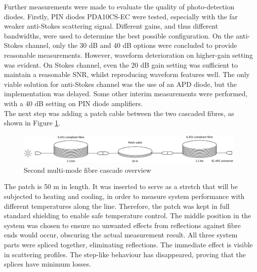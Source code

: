 \documentclass{standalone}
\begin{document}
Further measurements were made to evaluate the quality of photo-detection diodes. Firstly, PIN diodes PDA10CS-EC were tested, especially with the far weaker anti-Stokes scattering signal. Different gains, and thus different bandwidths, were used to determine the best possible configuration. On the anti-Stokes channel, only the 30 dB and 40 dB options were concluded to provide reasonable measurements. However, waveform deterioration on higher-gain setting was evident. On Stokes channel, even the 20 dB gain setting was sufficient to maintain a reasonable SNR, whilst reproducing waveform features well. The only viable solution for anti-Stokes channel was the use of an APD diode, but the implementation was delayed. Some other interim measurements were performed, with a 40 dB setting on PIN diode amplifiers. \\

The next step was adding a patch cable between the two cascaded fibres, as shown in Figure \ref{fig:mmf_second_cascade}.
\begin{figure}[h]
	\centering
	\includegraphics[width=1\textwidth]{mmf_second_cascade.png}
	\caption{Second multi-mode fibre cascade overview}
	\label{fig:mmf_second_cascade}
\end{figure}
The patch is 50 m in length. It was inserted to serve as a stretch that will be subjected to heating and cooling, in order to measure system performance with different temperatures along the line. Therefore, the patch was kept in full standard shielding to enable safe temperature control. The middle position in the system was chosen to ensure no unwanted effects from reflections against fibre ends would occur, obscuring the actual measurement result. All three system parts were spliced together, eliminating reflections. The immediate effect is visible in scattering profiles. The step-like behaviour has disappeared, proving that the splices have minimum losses. \\
\end{document}
